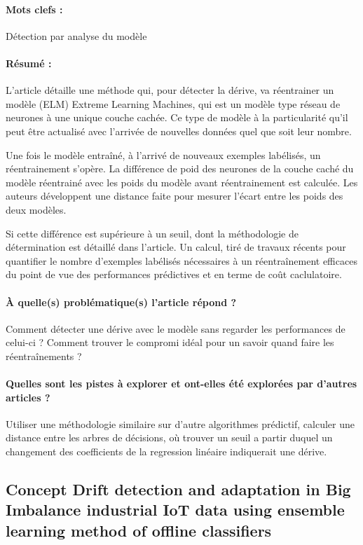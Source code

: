 \documentclass[11pt,a4paper]{report}
\begin{document}
\paragraph{Mots clefs :} Détection par analyse du modèle

\paragraph{Résumé :} L'article détaille une méthode qui, pour détecter la dérive, va réentrainer un modèle (ELM) Extreme Learning Machines, qui est un modèle type réseau de neurones à une unique couche cachée. Ce type de modèle à la particularité qu'il peut être actualisé avec l'arrivée de nouvelles données quel que soit leur nombre.

Une fois le modèle entraîné, à l'arrivé de nouveaux exemples labélisés, un réentrainement s'opère. La différence de poid des neurones de la couche caché du modèle réentrainé avec les poids du modèle avant réentrainement est calculée. Les auteurs développent une distance faite pour mesurer l'écart entre les poids des deux modèles.

Si cette différence est supérieure à un seuil, dont la méthodologie de détermination est détaillé dans l'article. Un calcul, tiré de travaux récents pour quantifier le nombre d'exemples labélisés nécessaires à un réentraînement efficaces du point de vue des performances prédictives et en terme de coût caclulatoire.

\paragraph{À quelle(s) problématique(s) l'article répond ?} Comment détecter une dérive avec le modèle sans regarder les performances de celui-ci ? Comment trouver le compromi idéal pour un savoir quand faire les réentraînements ?

\paragraph{Quelles sont les pistes à explorer et ont-elles  été explorées par d'autres articles ?} Utiliser une méthodologie similaire sur d'autre algorithmes prédictif, calculer une distance entre les arbres de décisions, où trouver un seuil a partir duquel un changement des coefficients de la regression linéaire indiquerait une dérive.






\subsection{Concept Drift detection and adaptation in Big Imbalance industrial IoT data using ensemble learning method of offline classifiers}
\end{document}
